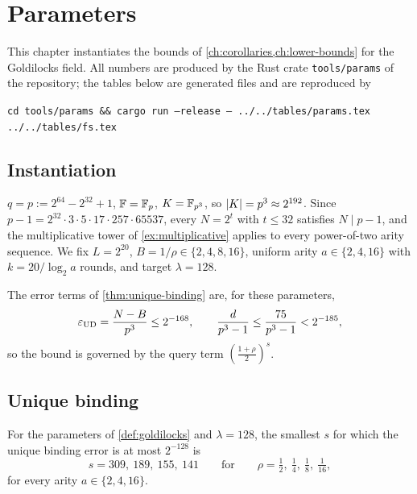 \chapter{Parameters}
\label{ch:parameters}

This chapter instantiates the bounds of \cref{ch:corollaries,ch:lower-bounds} for the
Goldilocks field. All numbers are produced by the Rust crate \texttt{tools/params} of the
repository; the tables below are generated files and are reproduced by
\begin{center}
\texttt{cd tools/params \&\& cargo run --release -- ../../tables/params.tex ../../tables/fs.tex}
\end{center}

\section{Instantiation}

\begin{definition}\label{def:goldilocks}
$q=p:=2^{64}-2^{32}+1$, $\mathbb{F}=\mathbb{F}_p$, $K=\mathbb{F}_{p^3}$, so $|K|=p^3\approx2^{192}$. Since
$p-1=2^{32}\cdot3\cdot5\cdot17\cdot257\cdot65537$, every $N=2^t$ with $t\le32$ satisfies
$N\mid p-1$, and the multiplicative tower of \cref{ex:multiplicative} applies to every power-of-two arity sequence. We fix
$L=2^{20}$, $B=1/\rho\in\{2,4,8,16\}$, uniform arity $a\in\{2,4,16\}$ with $k=20/\log_2a$
rounds, and target $\lambda=128$.
\end{definition}

The error terms of \cref{thm:unique-binding} are, for these parameters,
\[
\varepsilon_{\mathrm{UD}}=\frac{N-B}{p^3}\le2^{-168},\qquad
\frac d{p^3-1}\le\frac{75}{p^3-1}<2^{-185},
\]
so the bound is governed by the query term $(\frac{1+\rho}2)^s$.

\section{Unique binding}



\begin{proposition}\label{prop:exact-counts}
For the parameters of \cref{def:goldilocks} and $\lambda=128$, the smallest $s$ for which
the unique binding error is at most $2^{-128}$ is
\[
s=309,\ 189,\ 155,\ 141\qquad\text{for}\qquad \rho=\tfrac12,\ \tfrac14,\ \tfrac18,\ \tfrac1{16},
\]
for every arity $a\in\{2,4,16\}$.
\end{proposition}

